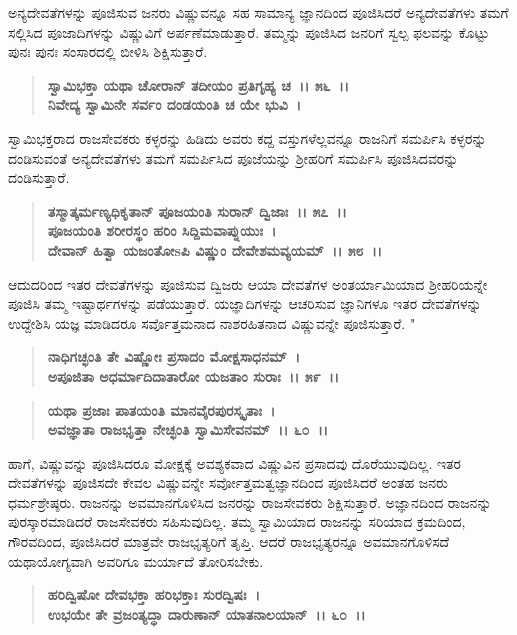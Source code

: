 ಅನ್ಯದೇವತೆಗಳನ್ನು ಪೂಜಿಸುವ ಜನರು ವಿಷ್ಣುವನ್ನೂ ಸಹ ಸಾಮಾನ್ಯ ಜ್ಞಾನದಿಂದ ಪೂಜಿಸಿದರೆ ಅನ್ಯದೇವತೆಗಳು ತಮಗೆ ಸಲ್ಲಿಸಿದ ಪೂಜಾದಿಗಳನ್ನು ವಿಷ್ಣುವಿಗೆ ಅರ್ಪಣೆಮಾಡುತ್ತಾರೆ. ತಮ್ಮನ್ನು ಪೂಜಿಸಿದ ಜನರಿಗೆ ಸ್ವಲ್ಪ ಫಲವನ್ನು ಕೊಟ್ಟು ಪುನಃ ಪುನಃ ಸಂಸಾರದಲ್ಲಿ ಬೀಳಿಸಿ ಶಿಕ್ಷಿಸುತ್ತಾರೆ.

\begin{verse}
\textbf{ಸ್ವಾಮಿಭಕ್ತಾ ಯಥಾ ಚೋರಾನ್ ತದೀಯಂ ಪ್ರತಿಗೃಹ್ಯ ಚ~।। ೫೬~।।}\\\textbf{ನಿವೇದ್ಯ ಸ್ವಾಮಿನೇ ಸರ್ವಂ ದಂಡಯಂತಿ ಚ ಯೇ ಭುವಿ~।}
\end{verse}

ಸ್ವಾಮಿಭಕ್ತರಾದ ರಾಜಸೇವಕರು ಕಳ್ಳರನ್ನು ಹಿಡಿದು ಅವರು ಕದ್ದ ವಸ್ತುಗಳೆಲ್ಲವನ್ನೂ ರಾಜನಿಗೆ ಸಮರ್ಪಿಸಿ ಕಳ್ಳರನ್ನು ದಂಡಿಸುವಂತೆ ಅನ್ಯದೇವತೆಗಳು ತಮಗೆ ಸಮರ್ಪಿಸಿದ ಪೂಜೆಯನ್ನು ಶ‍್ರೀಹರಿಗೆ ಸಮರ್ಪಿಸಿ ಪೂಜಿಸಿದವರನ್ನು ದಂಡಿಸುತ್ತಾರೆ.

\begin{verse}
\textbf{ತಸ್ಮಾತ್ಕರ್ಮಣ್ಯಧಿಕೃತಾನ್ ಪೂಜಯಂತಿ ಸುರಾನ್ ದ್ವಿಜಾಃ~।। ೫೭~।।}\\\textbf{ಪೂಜಯಂತಿ ಶರೀರಸ್ಥಂ ಹರಿಂ ಸಿದ್ದಿಮವಾಪ್ನುಯುಃ~। }\\\textbf{ದೇವಾನ್ ಹಿತ್ವಾ ಯಜಂತೋsಪಿ ವಿಷ್ಣುಂ ದೇವೇಶಮವ್ಯಯಮ್~।। ೫೮~।।}
\end{verse}

ಆದುದರಿಂದ ಇತರ ದೇವತೆಗಳನ್ನು ಪೂಜಿಸುವ ದ್ವಿಜರು ಆಯಾ ದೇವತೆಗಳ ಅಂತ\-ರ್ಯಾಮಿಯಾದ ಶ‍್ರೀಹರಿಯನ್ನೇ ಪೂಜಿಸಿ ತಮ್ಮ ಇಷ್ಟಾರ್ಥಗಳನ್ನು ಪಡೆಯುತ್ತಾರೆ. ಯಜ್ಞಾದಿಗಳನ್ನು ಆಚರಿಸುವ ಜ್ಞಾನಿಗಳೂ ಇತರ ದೇವತೆಗಳನ್ನು ಉದ್ದೇಶಿಸಿ ಯಜ್ಞ ಮಾಡಿದರೂ ಸರ್ವೊತ್ತಮನಾದ ನಾಶರಹಿತನಾದ ವಿಷ್ಣುವನ್ನೇ ಪೂಜಿಸುತ್ತಾರೆ. "

\begin{verse}
\textbf{ನಾಧಿಗಚ್ಛಂತಿ ತೇ ವಿಷ್ಣೋಃ ಪ್ರಸಾದಂ ಮೋಕ್ಷಸಾಧನಮ್~।}\\\textbf{ಅಪೂಜಿತಾ ಅಧರ್ಮಾದಿದಾತಾರೋ ಯಜತಾಂ ಸುರಾಃ~।। ೫೯~।। }
\end{verse}

\begin{verse}
\textbf{ಯಥಾ ಪ್ರಜಾಃ ಪಾತಯಂತಿ ಮಾನವೈರಪುರಸ್ಕೃತಾಃ~।}\\\textbf{ಅವಜ್ಞಾತಾ ರಾಜಭೃತ್ತಾ ನೇಚ್ಛಂತಿ ಸ್ವಾಮಿಸೇವನಮ್~।। ೬೦~।।}
\end{verse}

ಹಾಗೆ, ವಿಷ್ಣುವನ್ನು ಪೂಜಿಸಿದರೂ ಮೋಕ್ಷಕ್ಕೆ ಅವಶ್ಯಕವಾದ ವಿಷ್ಣುವಿನ ಪ್ರಸಾದವು ದೊರೆಯುವುದಿಲ್ಲ. ಇತರ ದೇವತೆಗಳನ್ನು ಪೂಜಿಸದೇ ಕೇವಲ ವಿಷ್ಣುವನ್ನೇ ಸರ್ವೋತ್ತಮತ್ವ\-ಜ್ಞಾನದಿಂದ ಪೂಜಿಸಿದರೆ ಅಂತಹ ಜನರು ಧರ್ಮಶ್ರೇಷ್ಠರು. ರಾಜನನ್ನು ಅವಮಾನಗೊಳಿಸಿದ ಜನರನ್ನು ರಾಜಸೇವಕರು ಶಿಕ್ಷಿಸುತ್ತಾರೆ. ಅಜ್ಞಾನದಿಂದ ರಾಜನನ್ನು ಪುರಸ್ಕಾರಮಾಡಿದರೆ ರಾಜಸೇವಕರು ಸಹಿಸುವುದಿಲ್ಲ. ತಮ್ಮ ಸ್ವಾಮಿಯಾದ ರಾಜನನ್ನು ಸರಿಯಾದ ಕ್ರಮದಿಂದ, ಗೌರವದಿಂದ, ಪೂಜಿಸಿದರೆ ಮಾತ್ರವೇ ರಾಜಭೃತ್ಯರಿಗೆ ತೃಪ್ತಿ. ಆದರೆ ರಾಜಭೃತ್ಯರನ್ನೂ ಅವಮಾನಗೊಳಿಸದೆ ಯಥಾಯೋಗ್ಯವಾಗಿ ಅವರಿಗೂ ಮರ್ಯಾದೆ ತೋರಿಸಬೇಕು.

\begin{verse}
\textbf{ಹರಿದ್ವಿಷೋ ದೇವಭಕ್ತಾ ಹರಿಭಕ್ತಾಃ ಸುರದ್ವಿಷಃ~।}\\\textbf{ಉಭಯೇ ತೇ ವ್ರಜಂತ್ಯದ್ಧಾ ದಾರುಣಾನ್ ಯಾತನಾಲಯಾನ್~।। ೬೦~।।}
\end{verse}

